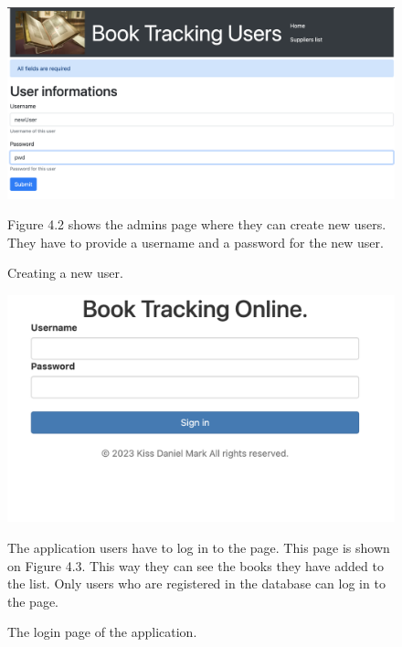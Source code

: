 \documentclass[11pt,a4paper,oneside]{report}
\begin{document}
\begin{figure}[!ht]
  \begin{center}
    \includegraphics[scale=0.3]{admin_create.png}
    \caption{Creating a new user.}
    \label{fig:TexnicCenter}
  \end{center}
  Figure 4.2 shows the admins page where they can create new users. They have to provide a username and a password for the new user.
\end{figure}


\begin{figure}[!ht]
  \begin{center}
    \includegraphics[scale=0.3]{frontend-login.png}
    \caption{The login page of the application.}
    \label{fig:TexnicCenter}
  \end{center}
  The application users have to log in to the page. This page is shown on Figure 4.3. This way they can see the books they have added to the list. Only users who are registered in the database can log in to the page.
\end{figure}
\end{document}
